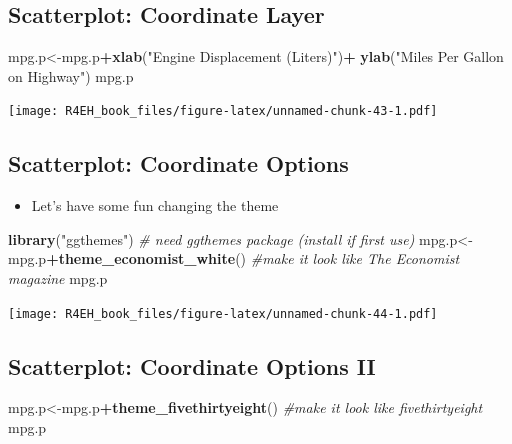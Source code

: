 \documentclass[]{book}
\newenvironment{Shaded}{\begin{snugshade}}{\end{snugshade}}
\newcommand{\KeywordTok}[1]{\textcolor[rgb]{0.13,0.29,0.53}{\textbf{#1}}}
\newcommand{\StringTok}[1]{\textcolor[rgb]{0.31,0.60,0.02}{#1}}
\newcommand{\CommentTok}[1]{\textcolor[rgb]{0.56,0.35,0.01}{\textit{#1}}}
\newcommand{\OperatorTok}[1]{\textcolor[rgb]{0.81,0.36,0.00}{\textbf{#1}}}
\newcommand{\NormalTok}[1]{#1}
\providecommand{\tightlist}{%
  \setlength{\itemsep}{0pt}\setlength{\parskip}{0pt}}
\theoremstyle{definition}
\theoremstyle{definition}
\theoremstyle{definition}
\theoremstyle{remark}
\begin{document}
\subsection{Scatterplot: Coordinate
Layer}\label{scatterplot-coordinate-layer}

\begin{Shaded}
\begin{Highlighting}[]
\NormalTok{mpg.p<-mpg.p}\OperatorTok{+}\KeywordTok{xlab}\NormalTok{(}\StringTok{"Engine Displacement (Liters)"}\NormalTok{)}\OperatorTok{+}
\StringTok{  }\KeywordTok{ylab}\NormalTok{(}\StringTok{"Miles Per Gallon on Highway"}\NormalTok{)}
\NormalTok{mpg.p}
\end{Highlighting}
\end{Shaded}

\texttt{[image: R4EH\_book\_files/figure-latex/unnamed-chunk-43-1.pdf]}

\subsection{Scatterplot: Coordinate
Options}\label{scatterplot-coordinate-options}

\begin{itemize}
\tightlist
\item
  Let's have some fun changing the theme
\end{itemize}

\begin{Shaded}
\begin{Highlighting}[]
\KeywordTok{library}\NormalTok{(}\StringTok{"ggthemes"}\NormalTok{) }\CommentTok{# need ggthemes package (install if first use)}
\NormalTok{mpg.p<-mpg.p}\OperatorTok{+}\KeywordTok{theme_economist_white}\NormalTok{() }\CommentTok{#make it look like The Economist magazine}
\NormalTok{mpg.p}
\end{Highlighting}
\end{Shaded}

\texttt{[image: R4EH\_book\_files/figure-latex/unnamed-chunk-44-1.pdf]}

\subsection{Scatterplot: Coordinate Options
II}\label{scatterplot-coordinate-options-ii}

\begin{Shaded}
\begin{Highlighting}[]
\NormalTok{mpg.p<-mpg.p}\OperatorTok{+}\KeywordTok{theme_fivethirtyeight}\NormalTok{() }\CommentTok{#make it look like fivethirtyeight}
\NormalTok{mpg.p}
\end{Highlighting}
\end{Shaded}
\end{document}
